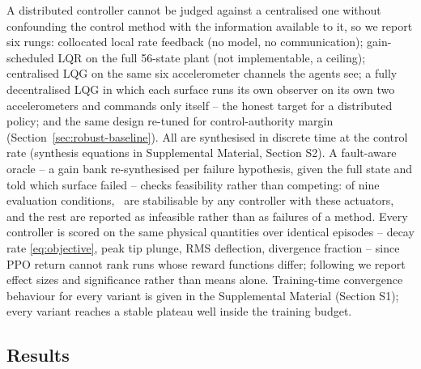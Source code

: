 \documentclass[preprint,11pt]{elsarticle}
\begin{document}
A distributed controller cannot be judged against a centralised one
without confounding the control method with the information available to
it, so we report six rungs: collocated local rate feedback (no model, no
communication); gain-scheduled LQR on the full 56-state plant (not
implementable, a ceiling); centralised LQG on the same six accelerometer
channels the agents see; a fully decentralised LQG in which each surface
runs its own observer on its own two accelerometers and commands only
itself \cite{siljak1991decentralized,anderson2007optimal} -- the honest
target for a distributed policy; and the same design re-tuned for
control-authority margin (Section~\ref{sec:robust-baseline}). All are
synthesised in discrete time at the control rate (synthesis equations in
Supplemental Material, Section S2). A fault-aware oracle -- a gain bank
re-synthesised per failure hypothesis, given the full state and told which
surface failed -- checks feasibility rather than competing: of nine
evaluation conditions, \FeasibleCells\ are stabilisable by any controller
with these actuators, and the rest are reported as infeasible rather than
as failures of a method. Every controller is scored on the same physical
quantities over identical episodes -- decay rate \eqref{eq:objective}, peak
tip plunge, RMS deflection, divergence fraction -- since PPO return cannot
rank runs whose reward functions differ; following
\cite{agarwal2021precipice} we report effect sizes and significance rather
than means alone. Training-time convergence behaviour for every variant is
given in the Supplemental Material (Section S1); every variant reaches a
stable plateau well inside the training budget.

\subsection{Results}
\label{sec:results}

\begin{table}[t]
\centering
\caption{Energy decay rate by controller and flight condition. Negative is
suppressed, \texttt{D} marks the fraction of episodes that diverged, and
\texttt{--} marks conditions infeasible for any controller.}
\label{tab:main}
\footnotesize

\end{table}
\end{document}
